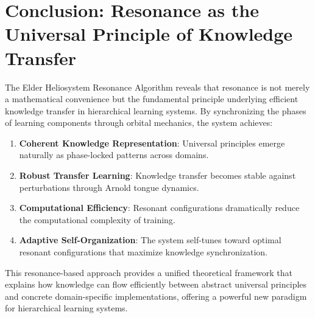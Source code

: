 \section{Conclusion: Resonance as the Universal Principle of Knowledge Transfer}

The Elder Heliosystem Resonance Algorithm reveals that resonance is not merely a mathematical convenience but the fundamental principle underlying efficient knowledge transfer in hierarchical learning systems. By synchronizing the phases of learning components through orbital mechanics, the system achieves:

\begin{enumerate}
    \item \textbf{Coherent Knowledge Representation}: Universal principles emerge naturally as phase-locked patterns across domains.
    
    \item \textbf{Robust Transfer Learning}: Knowledge transfer becomes stable against perturbations through Arnold tongue dynamics.
    
    \item \textbf{Computational Efficiency}: Resonant configurations dramatically reduce the computational complexity of training.
    
    \item \textbf{Adaptive Self-Organization}: The system self-tunes toward optimal resonant configurations that maximize knowledge synchronization.
\end{enumerate}

This resonance-based approach provides a unified theoretical framework that explains how knowledge can flow efficiently between abstract universal principles and concrete domain-specific implementations, offering a powerful new paradigm for hierarchical learning systems.